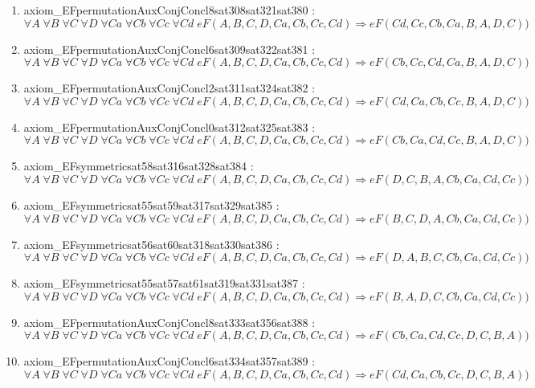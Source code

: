 \documentclass{article}
\begin{document}
\begin{enumerate}
\item axiom\_EFpermutationAuxConjConcl8sat308sat321sat380 : $\forall A\;\forall B\;\forall C\;\forall D\;\forall Ca\;\forall Cb\;\forall Cc\;\forall Cd\;eF(A, B, C, D, Ca, Cb, Cc, Cd) \Rightarrow eF(Cd, Cc, Cb, Ca, B, A, D, C))$
\item axiom\_EFpermutationAuxConjConcl6sat309sat322sat381 : $\forall A\;\forall B\;\forall C\;\forall D\;\forall Ca\;\forall Cb\;\forall Cc\;\forall Cd\;eF(A, B, C, D, Ca, Cb, Cc, Cd) \Rightarrow eF(Cb, Cc, Cd, Ca, B, A, D, C))$
\item axiom\_EFpermutationAuxConjConcl2sat311sat324sat382 : $\forall A\;\forall B\;\forall C\;\forall D\;\forall Ca\;\forall Cb\;\forall Cc\;\forall Cd\;eF(A, B, C, D, Ca, Cb, Cc, Cd) \Rightarrow eF(Cd, Ca, Cb, Cc, B, A, D, C))$
\item axiom\_EFpermutationAuxConjConcl0sat312sat325sat383 : $\forall A\;\forall B\;\forall C\;\forall D\;\forall Ca\;\forall Cb\;\forall Cc\;\forall Cd\;eF(A, B, C, D, Ca, Cb, Cc, Cd) \Rightarrow eF(Cb, Ca, Cd, Cc, B, A, D, C))$
\item axiom\_EFsymmetricsat58sat316sat328sat384 : $\forall A\;\forall B\;\forall C\;\forall D\;\forall Ca\;\forall Cb\;\forall Cc\;\forall Cd\;eF(A, B, C, D, Ca, Cb, Cc, Cd) \Rightarrow eF(D, C, B, A, Cb, Ca, Cd, Cc))$
\item axiom\_EFsymmetricsat55sat59sat317sat329sat385 : $\forall A\;\forall B\;\forall C\;\forall D\;\forall Ca\;\forall Cb\;\forall Cc\;\forall Cd\;eF(A, B, C, D, Ca, Cb, Cc, Cd) \Rightarrow eF(B, C, D, A, Cb, Ca, Cd, Cc))$
\item axiom\_EFsymmetricsat56sat60sat318sat330sat386 : $\forall A\;\forall B\;\forall C\;\forall D\;\forall Ca\;\forall Cb\;\forall Cc\;\forall Cd\;eF(A, B, C, D, Ca, Cb, Cc, Cd) \Rightarrow eF(D, A, B, C, Cb, Ca, Cd, Cc))$
\item axiom\_EFsymmetricsat55sat57sat61sat319sat331sat387 : $\forall A\;\forall B\;\forall C\;\forall D\;\forall Ca\;\forall Cb\;\forall Cc\;\forall Cd\;eF(A, B, C, D, Ca, Cb, Cc, Cd) \Rightarrow eF(B, A, D, C, Cb, Ca, Cd, Cc))$
\item axiom\_EFpermutationAuxConjConcl8sat333sat356sat388 : $\forall A\;\forall B\;\forall C\;\forall D\;\forall Ca\;\forall Cb\;\forall Cc\;\forall Cd\;eF(A, B, C, D, Ca, Cb, Cc, Cd) \Rightarrow eF(Cb, Ca, Cd, Cc, D, C, B, A))$
\item axiom\_EFpermutationAuxConjConcl6sat334sat357sat389 : $\forall A\;\forall B\;\forall C\;\forall D\;\forall Ca\;\forall Cb\;\forall Cc\;\forall Cd\;eF(A, B, C, D, Ca, Cb, Cc, Cd) \Rightarrow eF(Cd, Ca, Cb, Cc, D, C, B, A))$

\end{enumerate}
\end{document}
